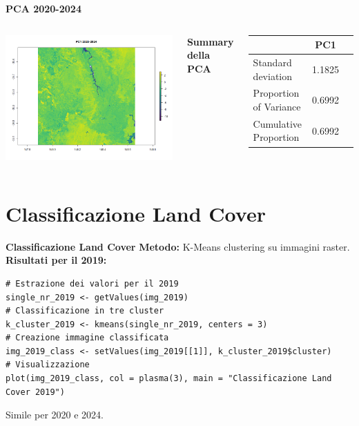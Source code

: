 \documentclass{beamer}
\begin{document}
\begin{frame}{\textbf{PCA 2020-2024}}
\begin{columns}
    \centering
    \includegraphics[width=\textwidth]{PCA_PC1_2020_2024.png}
    
    \centering
    \textbf{Summary della PCA}
    \begin{table}
        \centering
        \begin{tabular}{lcc}
            \toprule
            & PC1 \\
            \midrule
            Standard deviation     & 1.1825 \\
            Proportion of Variance & 0.6992 \\
            Cumulative Proportion  & 0.6992 \\
            \bottomrule
        \end{tabular}
    \end{table}
\end{columns}
\end{frame}

\section{Classificazione Land Cover}

\begin{frame}[fragile]{\textbf{Classificazione Land Cover}}
\textbf{Metodo:} K-Means clustering su immagini raster.
\newline
\newline
\textbf{Risultati per il 2019:}
\begin{lstlisting}
# Estrazione dei valori per il 2019
single_nr_2019 <- getValues(img_2019)
# Classificazione in tre cluster
k_cluster_2019 <- kmeans(single_nr_2019, centers = 3)
# Creazione immagine classificata
img_2019_class <- setValues(img_2019[[1]], k_cluster_2019$cluster)
# Visualizzazione
plot(img_2019_class, col = plasma(3), main = "Classificazione Land Cover 2019")
\end{lstlisting}
Simile per 2020 e 2024.
\end{frame}
\end{document}

